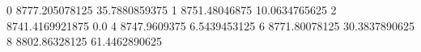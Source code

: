 0 8777.205078125 35.7880859375
1 8751.48046875 10.0634765625
2 8741.4169921875 0.0
4 8747.9609375 6.5439453125
6 8771.80078125 30.3837890625
8 8802.86328125 61.4462890625
